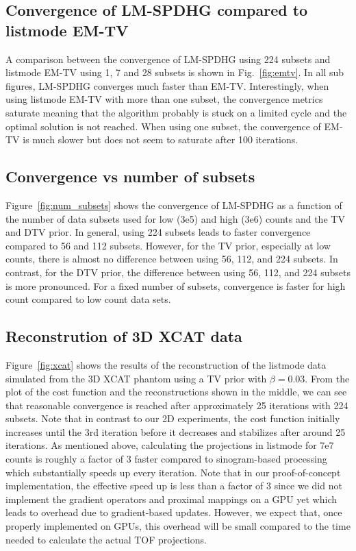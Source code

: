 \subsection*{Convergence of LM-SPDHG compared to listmode EM-TV}

A comparison between the convergence of LM-SPDHG using 224 subsets and listmode 
EM-TV using 1, 7 and 28 subsets is shown in Fig.~\ref{fig:emtv}.
In all sub figures, LM-SPDHG converges much faster than EM-TV.
Interestingly, when using listmode EM-TV with more than one subset, the convergence
metrics saturate meaning that the algorithm probably is stuck
on a limited cycle and the optimal solution is not reached.
When using one subset, the convergence of EM-TV is much slower but does not seem
to saturate after 100 iterations.


\subsection*{Convergence vs number of subsets}

Figure~\ref{fig:num_subsets} shows the convergence of LM-SPDHG as a function of the number of data
subsets used for low (3e5) and high (3e6) counts and the TV and DTV prior.
In general, using 224 subsets leads to faster convergence compared to 56 and 112 subsets.
However, for the TV prior, especially at low counts, there is almost no difference between using
56, 112, and 224 subsets.
In contrast, for the DTV prior, the difference between using 56, 112, and 224 subsets is more
pronounced.
For a fixed number of subsets, convergence is faster for high count compared to low count data sets.


\subsection*{Reconstrution of 3D XCAT data}

Figure~\ref{fig:xcat} shows the results of the reconstruction of the listmode data simulated
from the 3D XCAT phantom using a TV prior with $\beta = 0.03$. 
From the plot of the cost function and the reconstructions shown in the middle, we can see
that reasonable convergence is reached after approximately 25 iterations with 224 subsets.
Note that in contrast to our 2D experiments, the cost function initially increases until the 3rd iteration before it decreases and stabilizes after around 25 iterations.
As mentioned above, calculating the projections in listmode for 7e7 counts is roughly a factor
of 3 faster compared to sinogram-based processing which substantially speeds up every iteration.
Note that in our proof-of-concept implementation, the effective speed up is less than a 
factor of 3 since we did not implement the gradient operators and proximal mappings on a GPU yet
which leads to overhead due to gradient-based updates.
However, we expect that, once properly implemented on GPUs, this overhead will be small compared to
the time needed to calculate the actual TOF projections.


